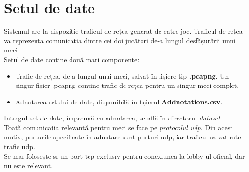 \documentclass[12pt, a4paper, twoside, romanian]{teza-upb}
\begin{document}
    \chapter{Setul de date}
        Sistemul are la dispozitie traficul de rețea generat de catre joc. Traficul de rețea va reprezenta comunicația dintre cei doi jucători de-a lungul desfășurării unui meci.\\
        Setul de date conține două mari componente:
            \begin{itemize}
                \item Trafic de rețea, de-a lungul unui meci, salvat în fișiere tip \textbf{.pcapng}. Un singur fișier .pcapng conține trafic de rețea pentru un singur meci complet.

                \item Adnotarea setului de date, disponibilă în fișierul \textbf{Addnotations.csv}.
            \end{itemize}
        Intregul set de date, împreună cu adnotarea, se află în directorul \textit{dataset}.\\
        Toată comunicația relevantă pentru meci se face pe \textit{protocolul udp}. Din acest motiv, porturile specificate în adnotare sunt porturi udp, iar traficul salvat este trafic udp.\\
        Se mai folosește si un port tcp exclusiv pentru conexiunea la lobby-ul oficial, dar nu este relevant.
\end{document}

